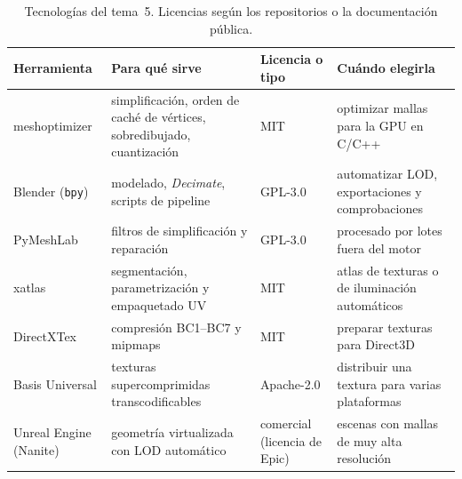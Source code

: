 \begin{table}[h]
\centering\small
\begin{tabularx}{\textwidth}{@{}l>{\raggedright\arraybackslash}X>{\raggedright\arraybackslash}p{2.6cm}>{\raggedright\arraybackslash}X@{}}
\toprule
Herramienta & Para qué sirve & Licencia o tipo & Cuándo elegirla \\
\midrule
meshoptimizer & simplificación, orden de caché de vértices, sobredibujado, cuantización & MIT & optimizar mallas para la GPU en C/C++ \\
Blender (\texttt{bpy}) & modelado, \emph{Decimate}, scripts de pipeline & GPL-3.0 & automatizar LOD, exportaciones y comprobaciones \\
PyMeshLab & filtros de simplificación y reparación & GPL-3.0 & procesado por lotes fuera del motor \\
xatlas & segmentación, parametrización y empaquetado UV & MIT & atlas de texturas o de iluminación automáticos \\
DirectXTex & compresión BC1--BC7 y mipmaps & MIT & preparar texturas para Direct3D \\
Basis Universal & texturas supercomprimidas transcodificables & Apache-2.0 & distribuir una textura para varias plataformas \\
Unreal Engine (Nanite) & geometría virtualizada con LOD automático & comercial (licencia de Epic) & escenas con mallas de muy alta resolución \\
\bottomrule
\end{tabularx}
\caption{Tecnologías del tema~5. Licencias según los repositorios o la documentación pública.}
\label{tab:tec5}
\end{table}

\addtocounter{definicion}{1}%

